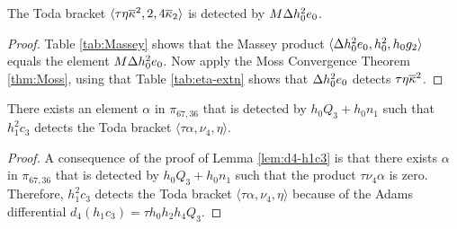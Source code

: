 \begin{lemma}
\label{lem:tetakappabar^2,2,4kappabar2}
The Toda bracket $\langle \tau \eta \overline{\kappa}^2, 2, 4 \overline{\kappa}_2 \rangle$
is detected by $M \Delta h_0^2 e_0$.
\end{lemma}

\begin{proof}
Table \ref{tab:Massey} shows that the Massey product
$\langle \Delta h_0^2 e_0, h_0^2, h_0 g_2 \rangle$ equals the element
$M \Delta h_0^2 e_0$.
Now apply the Moss Convergence Theorem \ref{thm:Moss}, using that
Table \ref{tab:eta-extn} shows that
$\Delta h_0^2 e_0$ detects $\tau \eta \overline{\kappa}^2$.
\end{proof}

\begin{lemma}
\label{lem:th0Q3,nu4,eta}
There exists an element $\alpha$ in $\pi_{67,36}$ that is detected
by $h_0 Q_3 + h_0 n_1$ such that 
$h_1^2 c_3$ detects the Toda bracket
$\langle \tau \alpha, \nu_4, \eta \rangle$.
\end{lemma}

\begin{proof}
A consequence of the proof of Lemma \ref{lem:d4-h1c3} is that
there exists $\alpha$ in $\pi_{67,36}$ that is detected by
$h_0 Q_3 + h_0 n_1$ such that
the product $\tau \nu_4 \alpha$ is zero.
Therefore,
$h_1^2 c_3$ detects the Toda bracket
$\langle \tau \alpha, \nu_4, \eta \rangle$ because
of the Adams differential $d_4(h_1 c_3) = \tau h_0 h_2 h_4 Q_3$.
\end{proof}
